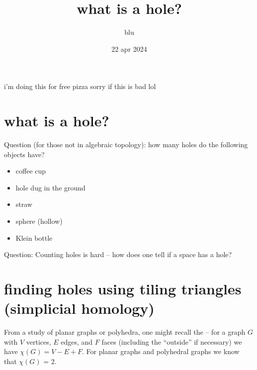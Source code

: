 \documentclass[12pt]{article}
\title{what is a hole?}
\author{blu}
\date{22 apr 2024} %
\begin{document}
\maketitle
\tableofcontents

i'm doing this for free pizza sorry if this is bad lol 

\section{what is a hole?}
Question (for those not in algebraic topology): how many holes do the following objects have? 
\begin{itemize}
  \item coffee cup
  \item hole dug in the ground
  \item straw 
  \item sphere (hollow) 
  \item Klein bottle
\end{itemize}

\noindent Question: Counting holes is hard -- how does one tell if a space has a hole?


\section{finding holes using tiling triangles (simplicial homology)}
   From a study of planar graphs or polyhedra, one might recall the  -- for a graph $G$ with $V$ vertices, $E$ edges, and $F$ faces
   (including the ``outside'' if necessary) we have $\chi(G) = V - E + F$. For
   planar graphs and polyhedral graphs we know that $\chi(G)$ = 2.
  
\end{document}
